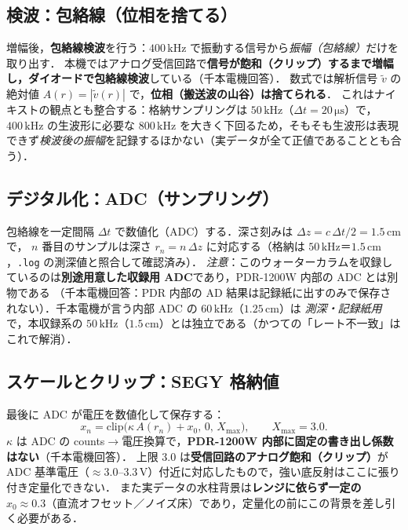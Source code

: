 \documentclass[11pt]{ltjsarticle}
\newcommand{\unit}[1]{\,\mathrm{#1}}
\begin{document}
\subsection{検波：包絡線（位相を捨てる）}
増幅後，\textbf{包絡線検波}を行う：$400\unit{kHz}$ で振動する信号から\emph{振幅（包絡線）}だけを取り出す．
本機ではアナログ受信回路で\textbf{信号が飽和（クリップ）するまで増幅し，ダイオードで包絡線検波}している（千本電機回答）．
数式では解析信号 $\tilde v$ の絶対値 $A(r)=|\tilde v(r)|$ で，\textbf{位相（搬送波の山谷）は捨てられる}．
これはナイキストの観点とも整合する：格納サンプリングは $50\unit{kHz}$（$\Delta t=20\unit{\mu s}$）で，$400\unit{kHz}$ の生波形に必要な
$800\unit{kHz}$ を大きく下回るため，そもそも生波形は表現できず\emph{検波後の振幅}を記録するほかない（実データが全て正値であることとも合う）．

\subsection{デジタル化：ADC（サンプリング）}
包絡線を一定間隔 $\Delta t$ で数値化（ADC）する．深さ刻みは $\Delta z=c\,\Delta t/2=1.5\unit{cm}$ で，
$n$ 番目のサンプルは深さ $r_n=n\,\Delta z$ に対応する（格納は $50\unit{kHz}$＝$1.5\unit{cm}$，\texttt{.log} の測深値と照合して確認済み）．
\emph{注意}：このウォーターカラムを収録しているのは\textbf{別途用意した収録用 ADC}であり，PDR-1200W 内部の ADC とは別物である
（千本電機回答：PDR 内部の AD 結果は記録紙に出すのみで保存されない）．千本電機が言う内部 ADC の $60\unit{kHz}$（$1.25\unit{cm}$）は
\emph{測深・記録紙用}で，本収録系の $50\unit{kHz}$（$1.5\unit{cm}$）とは独立である（かつての「レート不一致」はこれで解消）．

\subsection{スケールとクリップ：SEGY 格納値}
最後に ADC が電圧を数値化して保存する：
\begin{equation}
x_n=\mathrm{clip}\!\big(\kappa\,A(r_n)+x_0,\,0,\,X_{\max}\big),\qquad X_{\max}=3.0 .
\end{equation}
$\kappa$ は ADC の counts$\to$電圧換算で，\textbf{PDR-1200W 内部に固定の書き出し係数はない}（千本電機回答）．
上限 $3.0$ は\textbf{受信回路のアナログ飽和（クリップ）}が ADC 基準電圧（$\approx3.0$–$3.3\unit{V}$）付近に対応したもので，強い底反射はここに張り付き定量化できない．
また実データの水柱背景は\textbf{レンジに依らず一定の $x_0\approx0.3$}（直流オフセット／ノイズ床）であり，定量化の前にこの背景を差し引く必要がある．
\end{document}
